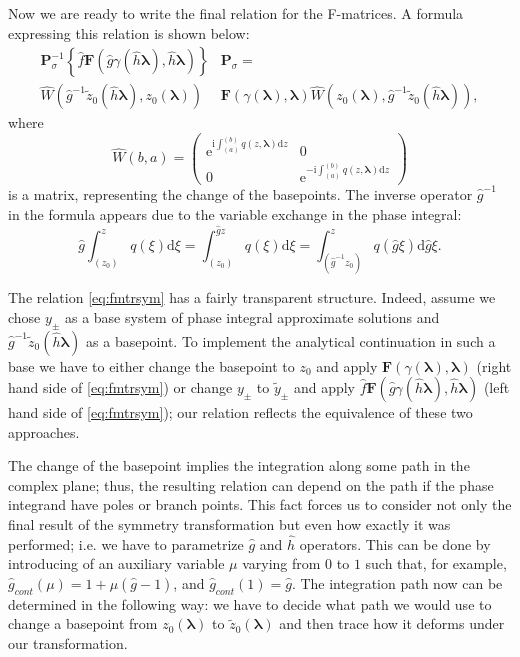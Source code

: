 \documentclass[atmp]{ipart_v1}
\def\rmd{\mathrm{d}}
\def\rme{\mathrm{e}}
\def\rmi{\mathrm{i}}
\def\lmbd{\bm{\lambda}}
\def\F{\bm{F}}
\def\f{\hat{f}}
\def\g{\hat{g}}
\def\h{\hat{h}}
\def\P{\bm{P}_\sigma}
\def\W{\widehat{W}}
\def\unity{1}
\newcommand\eref[1]{\eqref{#1}}
\newcommand\phsintgrnd[1][z]{q(#1,\lmbd)}
\newcommand\phsintgrl[3][z]{\int_{#2}^{#3} \phsintgrnd[#1] \rmd #1}
\begin{document}
Now we are ready to write the final relation for the F-matrices. A formula
expressing this relation is shown below:
\begin{equation}
\begin{split}
\P^{-1} \left\{ \f \F \left(\g \gamma(\h \lmbd), \h \lmbd \right) \right\} &\P=
 \\
   \W \left( \g^{-1} \tilde{z}_0(\h\lmbd), z_0(\lmbd) \right)&
   \F \left( \gamma(\lmbd), \lmbd \right)
   \W \left( z_0(\lmbd), \g^{-1} \tilde{z}_0(\h\lmbd) \right),
\end{split}
\label{eq:fmtrsym}
\end{equation}
where
\begin{equation}
\W(b,a) =  
\left(\begin{array}{*{2}{c}}
\rme^{\rmi \phsintgrl{(a)}{(b)}} & 0 \\ 0 & \rme^{-\rmi \phsintgrl{(a)}{(b)}} 
\end{array}\right)
\label{eq:W}
\end{equation}
is a matrix, representing the change of the basepoints. The inverse operator $\g^{-1}$ 
in the formula appears due to the variable exchange in the phase integral:
\begin{equation}
\g \int_{(z_0)}^z q(\xi) \rmd \xi = \int_{(z_0)}^{\g z} q(\xi) \rmd \xi 
= \int_{(\g^{-1}z_0)}^{z} q(\g\xi) \rmd \g\xi.
\end{equation}

The relation \eref{eq:fmtrsym} has a fairly transparent structure. Indeed, assume we chose
$y_\pm$ as a base system of phase integral approximate solutions and $\g^{-1} \tilde{z}_0(\h\lmbd)$
as a basepoint. To implement the analytical continuation in such a base
we have to either change the basepoint to $z_0$ and apply $\F(\gamma(\lmbd),\lmbd)$ 
(right hand side of \eref{eq:fmtrsym}) or change $y_\pm$ to $\tilde{y}_\pm$ and apply
$\f \F \left(\g \gamma(\h \lmbd), \h \lmbd \right)$ (left hand side of \eref{eq:fmtrsym}); our relation
reflects the equivalence of these two approaches.

The change of the basepoint implies the integration along some path in the complex plane;
thus, the resulting relation can depend on the path if the phase integrand have poles
or branch points. This fact forces us to consider not only the final result of the 
symmetry transformation but even how exactly it was performed; i.e. we have to parametrize
$\g$ and $\h$ operators. This can be done by introducing of an auxiliary variable $\mu$ varying 
from $0$ to $1$ such that, for example, $\g_{cont}(\mu)=\unity+\mu (\g-\unity)$, and $\g_{cont}(1)=\g$. 
The integration path now can be determined 
in the following way: we have to decide what path we would use to change a basepoint 
from $z_0(\lmbd)$ to $\tilde{z}_0(\lmbd)$ and then trace how it deforms under our transformation. 
\end{document}
